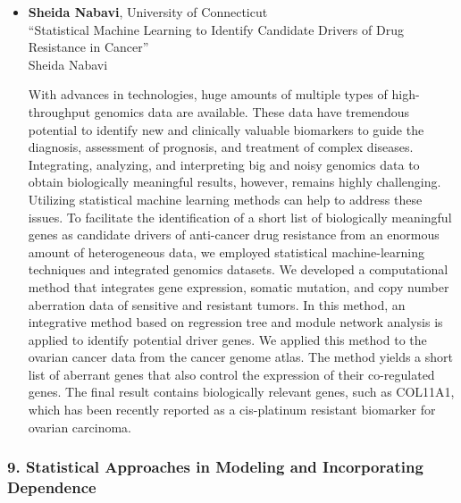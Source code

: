 \begin{itemize}
\item \textbf{Sheida Nabavi}, University of Connecticut \\
``Statistical Machine Learning to Identify Candidate Drivers of Drug Resistance in Cancer'' \\
Sheida Nabavi


With advances in technologies, huge amounts of multiple types of high-throughput genomics data are available. These data have tremendous potential to identify new and clinically valuable biomarkers to guide the diagnosis, assessment of prognosis, and treatment of complex diseases. Integrating, analyzing, and interpreting big and noisy genomics data to obtain biologically meaningful results, however, remains highly challenging. Utilizing statistical machine learning methods can help to address these issues.
To facilitate the identification of a short list of biologically meaningful genes as candidate drivers of anti-cancer drug resistance from an enormous amount of heterogeneous data, we employed statistical machine-learning techniques and integrated genomics datasets. We developed a computational method that integrates gene expression, somatic mutation, and copy number aberration data of sensitive and resistant tumors. In this method, an integrative method based on regression tree and module network analysis is applied to identify potential driver genes. We applied this method to the ovarian cancer data from the cancer genome atlas. The method yields a short list of aberrant genes that also control the expression of their co-regulated genes. The final result contains biologically relevant genes, such as COL11A1, which has been recently reported as a cis-platinum resistant biomarker for ovarian carcinoma. 

\end{itemize}

\subsubsection*{9. Statistical Approaches in Modeling and Incorporating Dependence}

